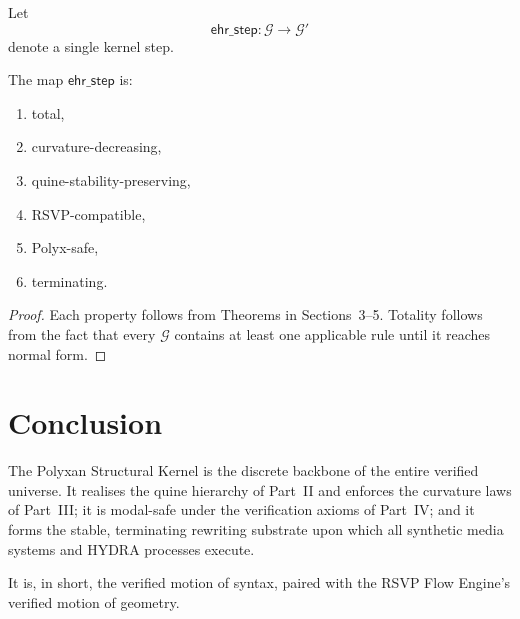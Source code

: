 Let
\[
\mathsf{ehr\_step} : \mathcal{G} \longrightarrow \mathcal{G}'
\]
denote a single kernel step.

\begin{theorem}
The map $\mathsf{ehr\_step}$ is:
\begin{enumerate}
\item total,  
\item curvature-decreasing,  
\item quine-stability-preserving,  
\item RSVP-compatible,  
\item Polyx-safe,  
\item terminating.
\end{enumerate}
\end{theorem}

\begin{proof}
Each property follows from Theorems in Sections~3–5.  
Totality follows from the fact that every $\mathcal{G}$ contains at least one
applicable rule until it reaches normal form.
\end{proof}

\section{Conclusion}

The Polyxan Structural Kernel is the discrete backbone of the entire verified
universe.  
It realises the quine hierarchy of Part~II and enforces the curvature laws of
Part~III; it is modal-safe under the verification axioms of Part~IV; and it
forms the stable, terminating rewriting substrate upon which all synthetic
media systems and HYDRA processes execute.

It is, in short, the verified motion of syntax, paired with the RSVP Flow
Engine's verified motion of geometry.


